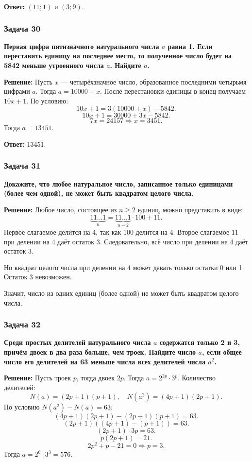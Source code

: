 \documentclass[12pt, a4paper]{article}
\begin{document}
\textbf{Ответ:} $(11; 1)$ и $(3; 9)$.

\subsubsection*{Задача 30}
\textbf{Первая цифра пятизначного натурального числа $a$ равна 1. Если переставить единицу на последнее место, то полученное число будет на 5842 меньше утроенного числа $a$. Найдите $a$.}

\textbf{Решение:}
Пусть $x$ — четырёхзначное число, образованное последними четырьмя цифрами $a$. Тогда $a = 10000 + x$. После перестановки единицы в конец получаем $10x + 1$. По условию:
\[
10x + 1 = 3(10000 + x) - 5842.
\]
\[
10x + 1 = 30000 + 3x - 5842.
\]
\[
7x = 24157 \Rightarrow x = 3451.
\]
Тогда $a = 13451$.

\textbf{Ответ:} 13451.

\subsubsection*{Задача 31}
\textbf{Докажите, что любое натуральное число, записанное только единицами (более чем одной), не может быть квадратом целого числа.}

\textbf{Решение:}
Любое число, состоящее из $n \ge 2$ единиц, можно представить в виде:
\[
\underbrace{11\ldots1}_{n} = \underbrace{11\ldots1}_{n-2} \cdot 100 + 11.
\]
Первое слагаемое делится на 4, так как $100$ делится на 4. Второе слагаемое $11$ при делении на 4 даёт остаток 3. Следовательно, всё число при делении на 4 даёт остаток 3.

Но квадрат целого числа при делении на 4 может давать только остатки 0 или 1. Остаток 3 невозможен.

Значит, число из одних единиц (более одной) не может быть квадратом целого числа.

\subsubsection*{Задача 32}
\textbf{Среди простых делителей натурального числа $a$ содержатся только 2 и 3, причём двоек в два раза больше, чем троек. Найдите число $a$, если общее число его делителей на 63 меньше числа всех делителей числа $a^2$.}

\textbf{Решение:}
Пусть троек $p$, тогда двоек $2p$. Тогда $a = 2^{2p} \cdot 3^p$. Количество делителей:
\[
N(a) = (2p+1)(p+1), \quad N(a^2) = (4p+1)(2p+1).
\]
По условию $N(a^2) - N(a) = 63$:
\[
(4p+1)(2p+1) - (2p+1)(p+1) = 63.
\]
\[
(2p+1)((4p+1) - (p+1)) = 63.
\]
\[
(2p+1) \cdot 3p = 63.
\]
\[
p(2p+1) = 21.
\]
\[
2p^2 + p - 21 = 0 \Rightarrow p = 3.
\]
Тогда $a = 2^6 \cdot 3^3 = 576$.
\end{document}
